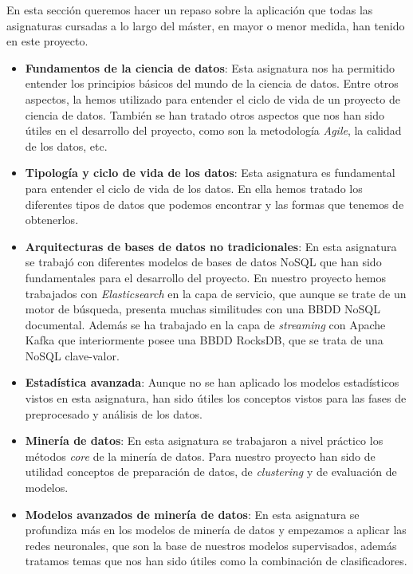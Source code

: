 En esta sección queremos hacer un repaso sobre la aplicación que todas las asignaturas cursadas a lo largo del máster, en mayor o menor medida, han tenido en este proyecto. 

\begin{itemize}

\item \textbf{Fundamentos de la ciencia de datos}: Esta asignatura nos ha permitido entender los principios básicos del mundo de la ciencia de datos. Entre otros aspectos, la hemos utilizado para entender el ciclo de vida de un proyecto de ciencia de datos. También se han tratado otros aspectos que nos han sido útiles en el desarrollo del proyecto, como son la metodología \textit{Agile}, la calidad de los datos, etc.

\item \textbf{Tipología y ciclo de vida de los datos}: Esta asignatura es fundamental para entender el ciclo de vida de los datos. En ella hemos tratado los diferentes tipos de datos que podemos encontrar y las formas que tenemos de obtenerlos.

\item \textbf{Arquitecturas de bases de datos no tradicionales}: En esta asignatura se trabajó con diferentes  modelos de bases de datos NoSQL que han sido fundamentales para el desarrollo del proyecto. En nuestro proyecto hemos trabajados con \textit{Elasticsearch} en la capa de servicio, que aunque se trate de un motor de búsqueda, presenta muchas similitudes con una BBDD NoSQL documental. Además se ha trabajado en la capa de \textit{streaming} con Apache Kafka que interiormente posee una BBDD RocksDB, que se trata de una NoSQL clave-valor. 

\item \textbf{Estadística avanzada}: Aunque no se han aplicado los modelos estadísticos vistos en esta asignatura, han  sido útiles los conceptos vistos para las fases de preprocesado y análisis de los datos.



\item \textbf{Minería de datos}: En esta asignatura se trabajaron a nivel práctico los métodos \textit{core} de la minería de datos. Para nuestro proyecto han sido de utilidad conceptos de preparación de datos, de \textit{clustering} y de evaluación de modelos. 

\item \textbf{Modelos avanzados de minería de datos}: En esta asignatura se profundiza más en los modelos de minería de datos y empezamos a aplicar las redes neuronales, que son la base de nuestros modelos supervisados, además tratamos temas que nos han sido útiles como la combinación de clasificadores.



\end{itemize}
